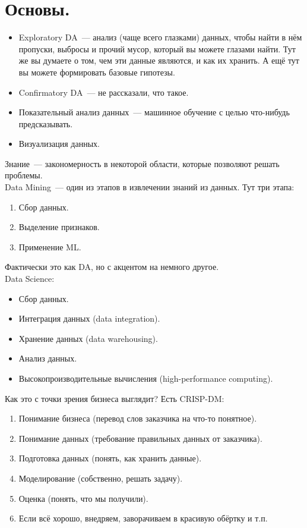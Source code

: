 \documentclass{article}
\begin{document}
    \tableofcontents
    \section{Основы.}
    \begin{itemize}
        \item Exploratory DA~--- анализ (чаще всего глазками) данных, чтобы найти в нём пропуски, выбросы и прочий мусор, который вы можете глазами найти. Тут же вы думаете о том, чем эти данные являются, и как их хранить. А ещё тут вы можете формировать базовые гипотезы.
        \item Confirmatory DA~--- не рассказали, что такое.
        \item Показательный анализ данных~--- машинное обучение с целью что-нибудь предсказывать.
        \item Визуализация данных.
    \end{itemize}
    Знание~--- закономерность в некоторой области, которые позволяют решать проблемы.\\
    Data Mining~--- один из этапов в извлечении знаний из данных. Тут три этапа:
    \begin{enumerate}
        \item Сбор данных.
        \item Выделение признаков.
        \item Применение ML.
    \end{enumerate}
    Фактически это как DA, но с акцентом на немного другое.\\
    Data Science:
    \begin{itemize}
        \item Сбор данных.
        \item Интеграция данных (data integration).
        \item Хранение данных (data warehousing).
        \item Анализ данных.
        \item Высокопроизводительные вычисления (high-performance computing).
    \end{itemize}
    Как это с точки зрения бизнеса выглядит? Есть CRISP-DM:
    \begin{enumerate}
        \item Понимание бизнеса (перевод слов заказчика на что-то понятное).
        \item Понимание данных (требование правильных данных от заказчика).
        \item Подготовка данных (понять, как хранить данные).
        \item Моделирование (собственно, решать задачу).
        \item Оценка (понять, что мы получили).
        \item Если всё хорошо, внедряем, заворачиваем в красивую обёртку и т.п.
    \end{enumerate}
\end{document}
